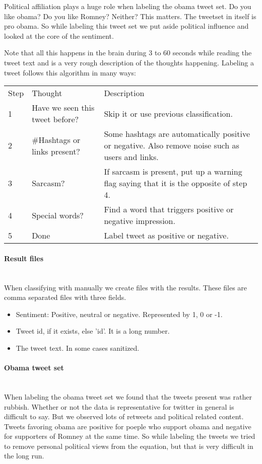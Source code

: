 Political affiliation plays a huge role when labeling the obama tweet set. Do
you like obama? Do you like Romney? Neither? This matters. The tweetset in
itself is pro obama. So while labeling this tweet set we put aside political
influence and looked at the core of the sentiment.

Note that all this happens in the brain during 3 to 60 seconds while reading
the tweet text and is a very rough description of the thoughts happening.
Labeling a tweet follows this algorithm in many ways:

\begin{tabular}{ l p{5cm} p{7cm} }
Step & Thought & Description \\
1 & Have we seen this tweet before? & Skip it or use previous classification. \\
2 & \#Hashtags or links present? & Some hashtags are automatically positive or
negative. Also remove noise such as users and links.\\
3 & Sarcasm? & If sarcasm is present, put up a warning flag saying that it is
the opposite of step 4.\\
4 & Special words? & Find a word that triggers positive or negative
impression.\\
5 & Done & Label tweet as positive or negative.\\
\end{tabular}

\paragraph{Result files}
\hspace{0pt}\\
When classifying with manually we create files with the results. These files
are comma separated files with three fields.
\begin{itemize}
    \item Sentiment: Positive, neutral or negative. Represented by 1, 0 or -1.
    \item Tweet id, if it exists, else 'id'. It is a long number.
    \item The tweet text. In some cases sanitized.
\end{itemize}

\paragraph{Obama tweet set}
\hspace{0pt}\\
When labeling the obama tweet set we found that the tweets present was rather
rubbish. Whether or not the data is representative for twitter in general is
difficult to say. But we observed lots of retweets and political related
content. Tweets favoring obama are positive for poeple who support obama and
negative for supporters of Romney at the same time. So while labeling the
tweets we tried to remove personal political views from the equation, but that
is very difficult in the long run.  

